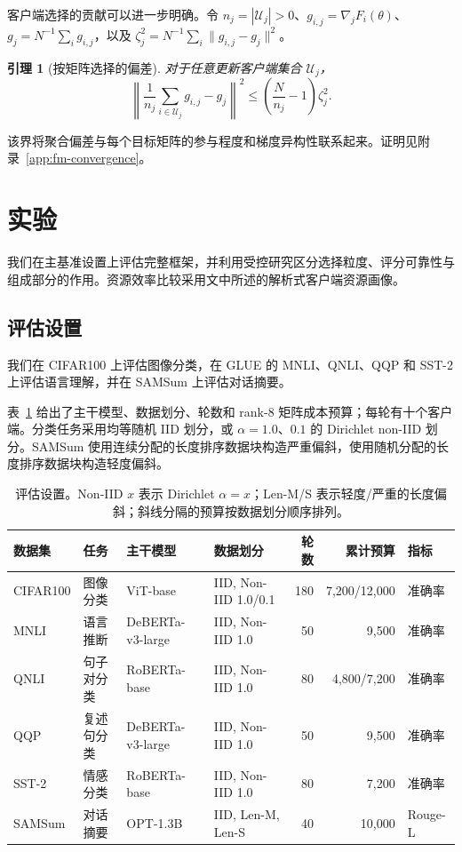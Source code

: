 \documentclass[10pt,conference,letterpaper]{IEEEtran}
\newtheorem{lemma}{引理}
\begin{document}
客户端选择的贡献可以进一步明确。令 $n_j=|\mathcal U_j|>0$、$g_{i,j}=\nabla_jF_i(\theta)$、$g_j=N^{-1}\sum_i g_{i,j}$，以及 $\zeta_j^2=N^{-1}\sum_i\|g_{i,j}-g_j\|^2$。
\begin{lemma}[按矩阵选择的偏差]
\label{lem:fm-selection-bias}
对于任意更新客户端集合 $\mathcal U_j$，
\begin{equation}
 \left\|\frac1{n_j}\sum_{i\in\mathcal U_j}g_{i,j}-g_j\right\|^2
 \le\left(\frac N{n_j}-1\right)\zeta_j^2.
\end{equation}
\end{lemma}
该界将聚合偏差与每个目标矩阵的参与程度和梯度异构性联系起来。证明见附录~\ref{app:fm-convergence}。



\section{实验}\label{Sec.evaluation}
我们在主基准设置上评估完整框架，并利用受控研究区分选择粒度、评分可靠性与组成部分的作用。资源效率比较采用文中所述的解析式客户端资源画像。

\subsection{评估设置}
我们在 CIFAR100 \cite{krizhevsky2009cifar} 上评估图像分类，在 GLUE \cite{wang2019glue} 的 MNLI、QNLI、QQP 和 SST-2 上评估语言理解，并在 SAMSum \cite{gliwa2019samsum} 上评估对话摘要。

表~\ref{tab:setup} 给出了主干模型、数据划分、轮数和 rank-8 矩阵成本预算；每轮有十个客户端。分类任务采用均等随机 IID 划分，或 $\alpha=1.0$、$0.1$ 的 Dirichlet non-IID 划分。SAMSum 使用连续分配的长度排序数据块构造严重偏斜，使用随机分配的长度排序数据块构造轻度偏斜。

\begin{table}[t]
\centering
\caption{评估设置。Non-IID \(x\) 表示 Dirichlet \(\alpha=x\)；Len-M/S 表示轻度/严重的长度偏斜；斜线分隔的预算按数据划分顺序排列。}
\label{tab:setup}
\setlength{\tabcolsep}{4.0pt}
\begin{tabular}{@{}llllrrl@{}}
\toprule
数据集 & 任务 & 主干模型 & 数据划分 & 轮数 & 累计预算 & 指标 \\
\midrule
CIFAR100 & 图像分类 & ViT-base \cite{dosovitskiy2021vit} & IID, Non-IID 1.0/0.1 & 180 & 7,200/12,000 & 准确率 \\
MNLI & 语言推断 & DeBERTa-v3-large \cite{he2021deberta} & IID, Non-IID 1.0 & 50 & 9,500 & 准确率 \\
QNLI & 句子对分类 & RoBERTa-base \cite{liu2019roberta} & IID, Non-IID 1.0 & 80 & 4,800/7,200 & 准确率 \\
QQP & 复述句分类 & DeBERTa-v3-large \cite{he2021deberta} & IID, Non-IID 1.0 & 50 & 9,500 & 准确率 \\
SST-2 & 情感分类 & RoBERTa-base \cite{liu2019roberta} & IID, Non-IID 1.0 & 80 & 7,200 & 准确率 \\
SAMSum & 对话摘要 & OPT-1.3B \cite{zhang2022opt} & IID, Len-M, Len-S & 40 & 10,000 & Rouge-L \\
\bottomrule
\end{tabular}
\end{table}
\end{document}
